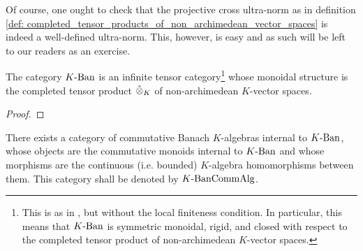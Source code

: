             \begin{remark}
                Of course, one ought to check that the projective cross ultra-norm as in definition \ref{def: completed_tensor_products_of_non_archimedean_vector_spaces} is indeed a well-defined ultra-norm. This, however, is easy and as such will be left to our readers as an exercise.  
            \end{remark}
            \begin{proposition} \label{prop: completed_tensor_products_of_non_archimedean_banach_spaces}
                The category $K\text{-}\mathrm{Ban}$ is an infinite tensor category\footnote{This is as in \cite[Definition 4.1.1]{EGNO}, but without the local finiteness condition. In particular, this means that $K\text{-}\mathrm{Ban}$ is symmetric monoidal, rigid, and closed with respect to the completed tensor product of non-archimedean $K$-vector spaces.} whose monoidal structure is the completed tensor product $\hattensor_K$ of non-archimedean $K$-vector spaces.
            \end{proposition}
                \begin{proof}
                    
                \end{proof}
            \begin{corollary}
                There exists a category of commutative Banach $K$-algebras internal to $K\text{-}\mathrm{Ban}$, whose objects are the commutative monoids internal to $K\text{-}\mathrm{Ban}$ and whose morphisms are the continuous (i.e. bounded) $K$-algebra homomorphisms between them. This category shall be denoted by $K\text{-}\mathrm{Ban}\mathrm{Comm}\mathrm{Alg}$. 
            \end{corollary}
            

